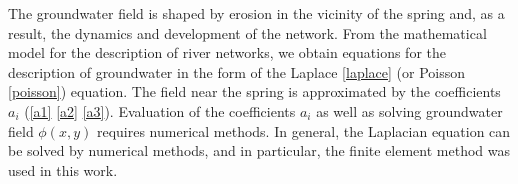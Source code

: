 \documentclass[]{pracamgr}
\begin{document}
    \hspace{1em} 
    The groundwater field is shaped by erosion in the vicinity of the spring and, as a result, the dynamics and development of the network. From the mathematical model for the description of river networks, we obtain equations for the description of groundwater in the form of the Laplace \ref{laplace} (or Poisson \ref{poisson}) equation. The field near the spring is approximated by the coefficients $a_i$ (\ref{a1} \ref{a2} \ref{a3}). Evaluation of the coefficients $a_i$ as well as solving groundwater field $\phi(x, y)$ requires numerical methods. In general, the Laplacian equation can be solved by numerical methods, and in particular, the finite element method was used in this work. \\ \indent
    
\end{document}
